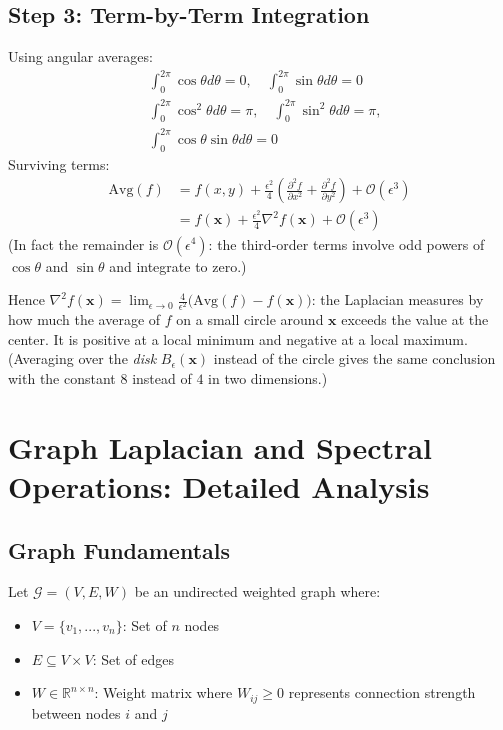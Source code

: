 \begin{notechapter}
\subsection{Step 3: Term-by-Term Integration}
Using angular averages:
\begin{align*}
&\int_0^{2\pi} \cos\theta d\theta = 0, \quad 
\int_0^{2\pi} \sin\theta d\theta = 0 \\
&\int_0^{2\pi} \cos^2\theta d\theta = \pi, \quad 
\int_0^{2\pi} \sin^2\theta d\theta = \pi, \\
&\int_0^{2\pi} \cos\theta\sin\theta d\theta = 0
\end{align*}
%
Surviving terms:
\begin{align*}
\text{Avg}(f) &= f(x,y) 
    + \frac{\epsilon^2}{4}\left(\frac{\partial^2 f}{\partial x^2} + \frac{\partial^2 f}{\partial y^2}\right) 
    + \mathcal{O}(\epsilon^3) \\
    &= f(\mathbf{x}) 
    + \frac{\epsilon^2}{4} \nabla^2 f(\mathbf{x}) 
        + \mathcal{O}(\epsilon^3)
\end{align*}
(In fact the remainder is $\mathcal{O}(\epsilon^4)$: the third-order terms involve odd powers of
$\cos\theta$ and $\sin\theta$ and integrate to zero.)

Hence $\nabla^2 f(\mathbf{x}) = \lim_{\epsilon\to 0} \frac{4}{\epsilon^2}\big(\text{Avg}(f) - f(\mathbf{x})\big)$:
the Laplacian measures by how much the average of $f$ on a small circle around $\mathbf{x}$
exceeds the value at the center. It is positive at a local minimum and negative at a local
maximum. (Averaging over the \emph{disk} $B_\epsilon(\mathbf{x})$ instead of the circle gives the
same conclusion with the constant $8$ instead of $4$ in two dimensions.)

\section{Graph Laplacian and Spectral Operations: Detailed Analysis}

\subsection{Graph Fundamentals}
Let $\mathcal{G}=(V,E,W)$ be an undirected weighted graph where:
\begin{itemize}
    \item $V = \{v_1,...,v_n\}$: Set of $n$ nodes
    \item $E \subseteq V \times V$: Set of edges
    \item $W \in \mathbb{R}^{n\times n}$: Weight matrix where $W_{ij} \geq 0$ 
        represents connection strength between nodes $i$ and $j$
\end{itemize}


\end{notechapter}
